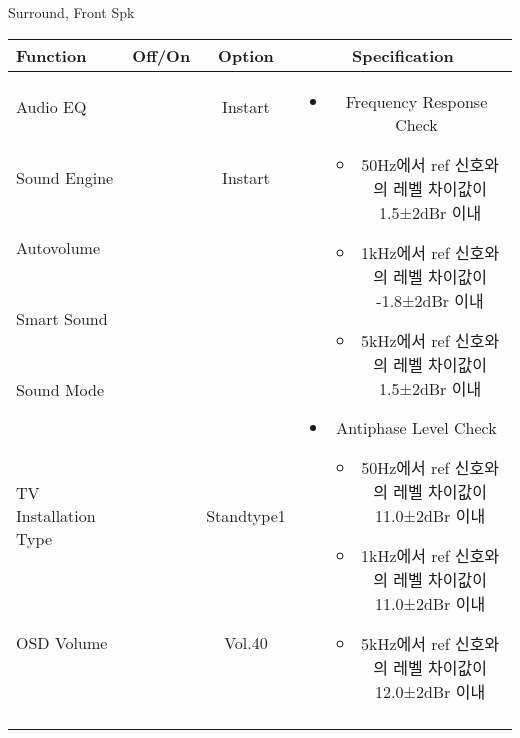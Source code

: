 \begin{frame}[t]{Surround, Front Spk}
\begin{tiny}
\begin{tabular}{@{}lccc@{}}
\toprule
Function & Off/On & Option & Specification \\
\midrule
Audio EQ & \color{black}{Off} & Instart &
\multirow{10}{60mm}{
\begin{itemize}
	\vspace{-3mm}
	\item Frequency Response Check
	\begin{itemize}
		\item 50Hz에서 ref 신호와의 레벨 차이값이 1.5±2dBr 이내
		\item 1kHz에서 ref 신호와의 레벨 차이값이 -1.8±2dBr 이내
		\item 5kHz에서 ref 신호와의 레벨 차이값이 1.5±2dBr 이내
	\end{itemize}
	\item Antiphase Level Check
	\begin{itemize}
		\item 50Hz에서 ref 신호와의 레벨 차이값이 11.0±2dBr 이내
		\item 1kHz에서 ref 신호와의 레벨 차이값이 11.0±2dBr 이내
		\item 5kHz에서 ref 신호와의 레벨 차이값이 12.0±2dBr 이내
	\end{itemize}
\end{itemize}
} \\
Sound Engine & \color{blue}{On} & Instart & \\
Autovolume & \color{black}{Off} & & \\
Smart Sound & \color{black}{Off} & & \\
Sound Mode & \color{blue}{On} & \color{blue}{Surround} & \\
TV Installation Type & \color{blue}{On} & Standtype1 & \\
OSD Volume & \color{blue}{On} & Vol.40 & \\
& & & \\
& & & \\
& & & \\
& & & \\
\midrule
\end{tabular}
\end{tiny}


\end{frame}

